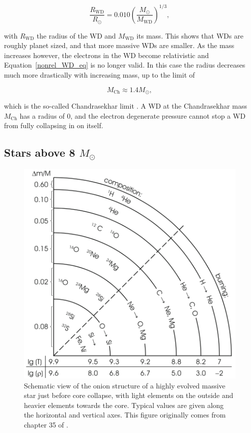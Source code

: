 \documentclass[a4paper,oneside,12pt, class=Latex/Classes/PhDthesisPSnPDF, crop=false]{standalone}
\begin{document}
\begin{equation}
    \label{nonrel_WD_eq}
    \frac{R_\text{WD}}{R_\odot} = 0.010 \left(\frac{M_\odot}{M_\text{WD}}\right)^{1/3},
\end{equation}

with $R_\text{WD}$ the radius of the WD and $M_\text{WD}$ its mass. This shows that WDs are roughly planet sized, and that more massive WDs are smaller. As the mass increases however, the electrons in the WD become relativistic and Equation~\ref{nonrel_WD_eq} is no longer valid. In this case the radius decreases much more drastically with increasing mass, up to the limit of 

\begin{equation}
    \label{Chandrasekhar_lim}
    M_\text{Ch} \approx 1.4 M_\odot,
\end{equation}

which is the so-called Chandrasekhar limit \citep{Chandrasekhar_lim}. A WD at the Chandrasekhar mass $M_\text{Ch}$ has a radius of 0, and the electron degenerate pressure cannot stop a WD from fully collapsing in on itself.


\subsection{Stars above 8 $M_\odot$}
\label{ge_8_Msol}

\begin{figure}
    \centering
    \includegraphics[width=\textwidth]{../Images/chapter_1/starstruct.png}
    \caption{Schematic view of the onion structure of a highly evolved massive star just before core collapse, with light elements on the outside and heavier elements towards the core. Typical values are given along the horizontal and vertical axes. This figure originally comes from chapter 35 of \citet{starstruct}.}
    \label{startstruct}
\end{figure}
\end{document}
